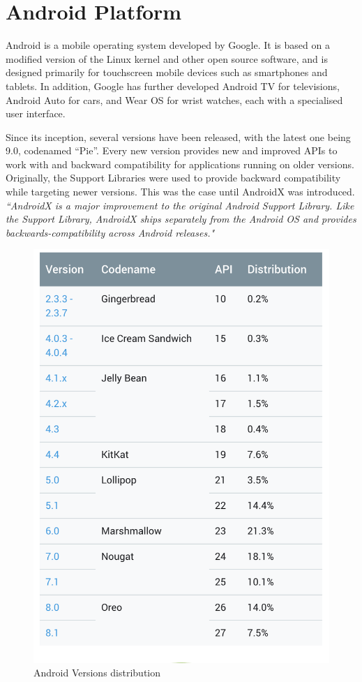 \documentclass[thesis=B,english]{FITthesis}[2012/10/20]
\newcommand{\quoting}[1]{\textit{``#1"}}
\begin{document}
	\section{Android Platform}
Android is a mobile operating system developed by Google. It is based on a modified version of the Linux kernel and other open source software, and is designed primarily for touchscreen mobile devices such as smartphones and tablets. In addition, Google has further developed Android TV for televisions, Android Auto for cars, and Wear OS for wrist watches, each with a specialised user interface.

Since its inception, several versions have been released, with the latest one being 9.0, codenamed \enquote{Pie}. Every new version provides new and improved APIs to work with and backward compatibility for applications running on older versions. Originally, the Support Libraries were used to provide backward compatibility while targeting newer versions. This was the case until AndroidX was introduced.
 \quoting{AndroidX is a major improvement to the original Android Support Library. Like the Support Library, AndroidX ships separately from the Android OS and provides backwards-compatibility across Android releases.} \cite{androix-overview}



\begin{figure}[H]
\center
  \includegraphics[scale=0.5]{adnroidversion.png}
  \caption{Android Versions distribution}
  \label{fig:androidversions}
\end{figure}
\end{document}
